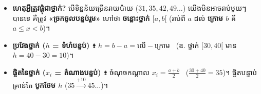 \documentclass[theme=teal]{khmermath}
\begin{document}
\begin{khboxorange}[title={\fontsize{10}{8.5}\selectfont\kml\color{white}\ding{72}\ គំនិតសាមញ្ញបែប  ៖ ការច្រកទិន្នន័យដាក់តាមបន្ទប់ (ឬប្រអប់)}]
  \begin{itemize}[leftmargin=10pt, itemsep=0.5pt, topsep=0pt, parsep=0pt]
    \item[\color{brandNavy}\ding{228}] \textbf{ហេតុអ្វីត្រូវផ្គុំជាថ្នាក់?} បើទិន្នន័យច្រើនរាយប៉ាយ ($31, 35, 42, 49\dots$) យើងមិនអាចរាប់មួយៗបានទេ គឺត្រូវ \textbf{«ច្រកចូលបន្ទប់រួម»} ហៅថា \textbf{ចន្លោះថ្នាក់ $[a, b[$} (រាប់ពី $a$ ដល់ \textbf{ក្រោម $b$} គឺ $a \le x < b$)។
    \item[\color{brandBlue}\ding{228}] \textbf{ប្រវែងថ្នាក់ ($h$ = ទំហំបន្ទប់) ៖} $h = b - a = \text{លើ} - \text{ក្រោម}$ \ (ឧ. ថ្នាក់ $[30, 40[$ មាន $h = 40 - 30 = 10$)។
    \item[\color{brandCrimson}\ding{228}] \textbf{ផ្ចិតនៃថ្នាក់ ($x_i$ = តំណាងបន្ទប់) ៖} ចំណុចកណ្ដាល $x_i = \frac{a+b}{2}$ \ ($\frac{30+40}{2} = 35$)។ ផ្ចិតបន្ទាប់គ្រាន់តែ \textbf{បូកថែម $h$} ($35 \xrightarrow{+10} 45 \dots$)។
  \end{itemize}
\end{khboxorange}
\end{document}
